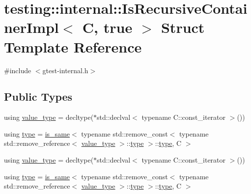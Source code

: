 \hypertarget{structtesting_1_1internal_1_1_is_recursive_container_impl_3_01_c_00_01true_01_4}{}\section{testing\+::internal\+::Is\+Recursive\+Container\+Impl$<$ C, true $>$ Struct Template Reference}
\label{structtesting_1_1internal_1_1_is_recursive_container_impl_3_01_c_00_01true_01_4}


{\ttfamily \#include $<$gtest-\/internal.\+h$>$}

\subsection*{Public Types}
\begin{DoxyCompactItemize}
\item 
using \mbox{\hyperlink{structtesting_1_1internal_1_1_is_recursive_container_impl_3_01_c_00_01true_01_4_a5e8e2cf58f0d2581e9e3ab5f5630cd61}{value\+\_\+type}} = decltype($\ast$std\+::declval$<$ typename C\+::const\+\_\+iterator $>$())
\item 
using \mbox{\hyperlink{structtesting_1_1internal_1_1_is_recursive_container_impl_3_01_c_00_01true_01_4_a24b611fbe1b9a7c524ee54ae01324388}{type}} = \mbox{\hyperlink{structtesting_1_1internal_1_1is__same}{is\+\_\+same}}$<$ typename std\+::remove\+\_\+const$<$ typename std\+::remove\+\_\+reference$<$ \mbox{\hyperlink{structtesting_1_1internal_1_1_is_recursive_container_impl_3_01_c_00_01true_01_4_a5e8e2cf58f0d2581e9e3ab5f5630cd61}{value\+\_\+type}} $>$\+::\mbox{\hyperlink{structtesting_1_1internal_1_1_is_recursive_container_impl_3_01_c_00_01true_01_4_a24b611fbe1b9a7c524ee54ae01324388}{type}} $>$\+::\mbox{\hyperlink{structtesting_1_1internal_1_1_is_recursive_container_impl_3_01_c_00_01true_01_4_a24b611fbe1b9a7c524ee54ae01324388}{type}}, C $>$
\item 
using \mbox{\hyperlink{structtesting_1_1internal_1_1_is_recursive_container_impl_3_01_c_00_01true_01_4_a5e8e2cf58f0d2581e9e3ab5f5630cd61}{value\+\_\+type}} = decltype($\ast$std\+::declval$<$ typename C\+::const\+\_\+iterator $>$())
\item 
using \mbox{\hyperlink{structtesting_1_1internal_1_1_is_recursive_container_impl_3_01_c_00_01true_01_4_a24b611fbe1b9a7c524ee54ae01324388}{type}} = \mbox{\hyperlink{structtesting_1_1internal_1_1is__same}{is\+\_\+same}}$<$ typename std\+::remove\+\_\+const$<$ typename std\+::remove\+\_\+reference$<$ \mbox{\hyperlink{structtesting_1_1internal_1_1_is_recursive_container_impl_3_01_c_00_01true_01_4_a5e8e2cf58f0d2581e9e3ab5f5630cd61}{value\+\_\+type}} $>$\+::\mbox{\hyperlink{structtesting_1_1internal_1_1_is_recursive_container_impl_3_01_c_00_01true_01_4_a24b611fbe1b9a7c524ee54ae01324388}{type}} $>$\+::\mbox{\hyperlink{structtesting_1_1internal_1_1_is_recursive_container_impl_3_01_c_00_01true_01_4_a24b611fbe1b9a7c524ee54ae01324388}{type}}, C $>$
\end{DoxyCompactItemize}


